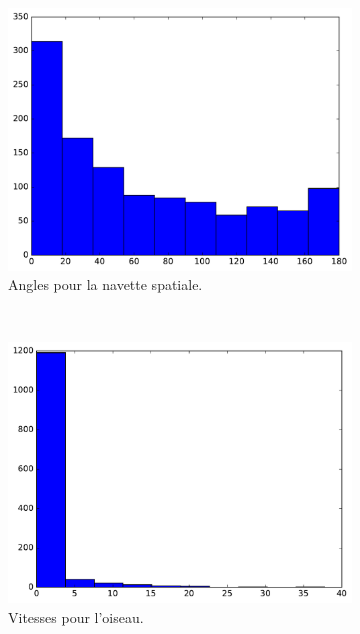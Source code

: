 \begin{figure}
\begin{subfigure}[t]{\subImgWclicks}
			\centering
			\includegraphics[width=\textwidth]{figures/ch3/spaceA_angle}
			\caption{Angles pour la navette spatiale.}
			\label{fig:spaceA_angle}
		\end{subfigure}
		~
		\begin{subfigure}[t]{\subImgWclicks}
			\centering
			\includegraphics[width=\textwidth]{figures/ch3/oiseau_speed}
			\caption{Vitesses pour l'oiseau.}
			\label{fig:oiseau_speed}
		\end{subfigure}
		~
		\begin{subfigure}[t]{\subImgWclicks}
			\centering

\end{subfigure}
\end{figure}
